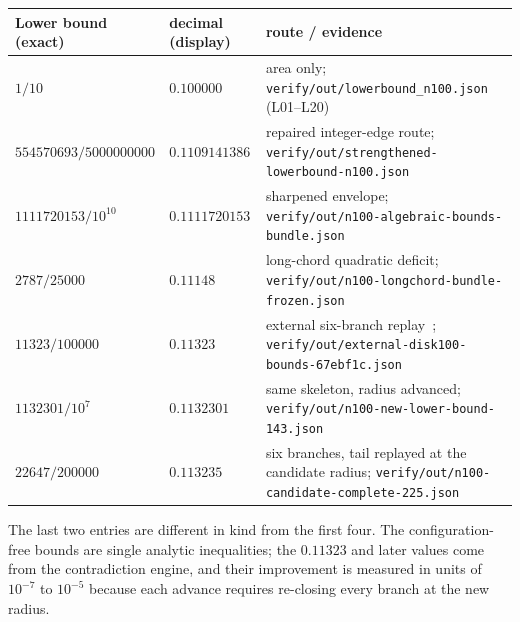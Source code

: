 \begin{center}
\footnotesize
\begin{tabular}{@{}>{\raggedright\arraybackslash}p{}>{\raggedright\arraybackslash}p{}>{\raggedright\arraybackslash}p{}@{}}
\toprule
Lower bound (exact) & decimal (display) & route / evidence \\
\midrule
$1/10$ & $0.100000$ & area only; \texttt{verify/\allowbreak{}out/\allowbreak{}lowerbound\_\allowbreak{}n100.json} (L01--L20) \\
$554570693/5000000000$ & $0.1109141386$ & repaired integer-edge route;
\texttt{verify/\allowbreak{}out/\allowbreak{}strengthened-\allowbreak{}lowerbound-\allowbreak{}n100.json} \\
$1111720153/10^{10}$ & $0.1111720153$ & sharpened envelope;
\texttt{verify/\allowbreak{}out/\allowbreak{}n100-\allowbreak{}algebraic-\allowbreak{}bounds-\allowbreak{}bundle.json} \\
$2787/25000$ & $0.11148$ & long-chord quadratic deficit;
\texttt{verify/\allowbreak{}out/\allowbreak{}n100-\allowbreak{}longchord-\allowbreak{}bundle-\allowbreak{}frozen.json} \\
$11323/100000$ & $0.11323$ & external six-branch replay~\cite{external67ebf1c};
\texttt{verify/\allowbreak{}out/\allowbreak{}external-\allowbreak{}disk100-\allowbreak{}bounds-\allowbreak{}67ebf1c.json} \\
$1132301/10^{7}$ & $0.1132301$ & same skeleton, radius advanced;
\texttt{verify/\allowbreak{}out/\allowbreak{}n100-\allowbreak{}new-\allowbreak{}lower-\allowbreak{}bound-\allowbreak{}143.json} \\
$22647/200000$ & $\mathbf{0.113235}$ & six branches, tail replayed at the candidate radius;
\texttt{verify/\allowbreak{}out/\allowbreak{}n100-\allowbreak{}candidate-\allowbreak{}complete-\allowbreak{}225.json} \\
\bottomrule
\end{tabular}
\end{center}

The last two entries are different in kind from the first four. The configuration-free bounds are
single analytic inequalities; the $0.11323$ and later values come from the contradiction engine, and
their improvement is measured in units of $10^{-7}$ to $10^{-5}$ because each advance requires
re-closing every branch at the new radius.

